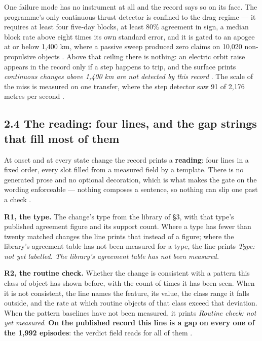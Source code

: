 \documentclass[11pt]{article}
\begin{document}
One failure mode has no instrument at all and the record says so on its face. The programme's only continuous-thrust detector is confined to the drag regime --- it requires at least four five-day blocks, at least 80\% agreement in sign, a median block rate above eight times its own standard error, and it is gated to an apogee at or below 1,400 km, where a passive sweep produced zero claims on 10,020 non-propulsive objects%
. Above that ceiling there is nothing: an electric orbit raise appears in the record only if a step happens to trip, and the surface prints \emph{continuous changes above 1,400 km are not detected by this record}%
. The scale of the miss is measured on one transfer, where the step detector saw 91 of 2,176 metres per second%
.

\subsection*{2.4 The reading: four lines, and the gap strings that fill most of them}

At onset and at every state change the record prints a \textbf{reading}: four lines in a fixed order, every slot filled from a measured field by a template. There is no generated prose and no optional decoration, which is what makes the gate on the wording enforceable --- nothing composes a sentence, so nothing can slip one past a check%
.

\textbf{R1, the type.} The change's type from the library of \S{}3, with that type's published agreement figure and its support count. Where a type has fewer than twenty matched changes the line prints that instead of a figure; where the library's agreement table has not been measured for a type, the line prints \emph{Type: not yet labelled. The library's agreement table has not been measured.}

\textbf{R2, the routine check.} Whether the change is consistent with a pattern this class of object has shown before, with the count of times it has been seen. When it is not consistent, the line names the feature, its value, the class range it falls outside, and the rate at which routine objects of that class exceed that deviation. When the pattern baselines have not been measured, it prints \emph{Routine check: not yet measured}. \textbf{On the published record this line is a gap on every one of the 1,992 episodes}: the verdict field reads  for all of them%
.
\end{document}
